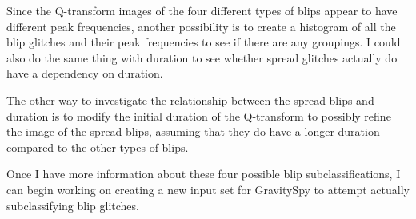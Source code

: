 \documentclass[a4paper]{article}
\begin{document}
Since the Q-transform images of the four different types of blips appear to have different peak frequencies, another possibility is to create a histogram of all the blip glitches and their peak frequencies to see if there are any groupings. I could also do the same thing with duration to see whether spread glitches actually do have a dependency on duration.

The other way to investigate the relationship between the spread blips and duration is to modify the initial duration of the Q-transform to possibly refine the image of the spread blips, assuming that they do have a longer duration compared to the other types of blips.

Once I have more information about these four possible blip subclassifications, I can begin working on creating a new input set for GravitySpy to attempt actually subclassifying blip glitches.




\end{document}
